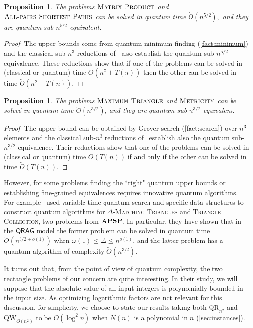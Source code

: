 \documentclass[12pt]{article}
\newcommand{\qr}{\mathrm{QR}}
\newcommand{\qw}{\mathrm{QW}}
\newcommand{\MP}{\textsc{Matrix Product}}
\newcommand{\Met}{\textsc{Metricity}}
\newcommand{\MaxT}{\textsc{Maximum Triangle}}
\newcommand{\APSPf}{\textsc{All-pairs Shortest Paths}}
\newcommand{\APSPc}{\bf{APSP}}
\newtheorem{proposition}[theorem]{Proposition}
\theoremstyle{definition}
\begin{document}
\begin{proposition}
The problems $\MP$ and $\APSPf$  can be solved in quantum time $\widetilde{O}(n^{5/2}),$ and they are quantum { sub}-$n^{5/2}$ equivalent.
\end{proposition}

\begin{proof}
The upper bounds come from quantum minimum finding (\cref{fact:minimum}) and the classical sub-$n^3$ reductions of~\cite{FM71, Mun71} also establish the quantum sub-$n^{5/2}$ equivalence. 
These reductions show that if one of the problems can be solved in (classical or quantum) time ${O}(n^2 +T(n))$ then the other can be solved in time $\widetilde{O}(n^2 +T(n))$.
\end{proof}

\begin{proposition}
The problems $\MaxT$ and $\Met$ can be solved in quantum time $\widetilde{O}(n^{3/2})$, and they are quantum { sub}-$n^{3/2}$ equivalent.
\end{proposition}

\begin{proof}
The upper bound can be obtained by Grover search (\cref{fact:search}) over $n^3$ elements and the classical sub-$n^3$ reductions of~\cite{VW18} establish also the quantum sub-$n^{3/2}$ equivalence. Their reductions show that one of the problems can be solved in (classical or quantum) time ${O}(T(n))$ if and only if the other can be solved in time $\widetilde{O}(T(n))$.
\end{proof}

However, for some problems finding the ``right" quantum upper bounds or establishing fine-grained equivalences requires innovative quantum algorithms. For example~\cite{ABLPS22} used variable time quantum search and specific data structures to construct quantum algorithms for {\textsc{$\Delta$-Matching Triangles}} and {\textsc{Triangle Collection}}, two problems from $\APSPc$. 
In particular, they have shown that in the $\mathsf{QRAG}$ model the former problem can be solved in quantum time $\widetilde{O}(n^{3/2 + o(1)})$ when $\omega(1) \leq \Delta \leq n^{o(1)}$, and the latter problem has a quantum algorithm of complexity $\widetilde{O}(n^{3/2})$.

It turns out that, from the point of view of quantum complexity, the two rectangle problems of our concern are quite interesting. In their study, we will suppose that the absolute value of all input integers is polynomially bounded in the input size. As optimizing logarithmic factors are not relevant for this discussion, for simplicity, we choose to state our results taking both $\qr_{n^2}$ and $\qw_{O(n^2)}$ to be $O(\log^2n)$ when $N(n)$ is a polynomial in $n$ (\cref{sec:instances}).
\end{document}

